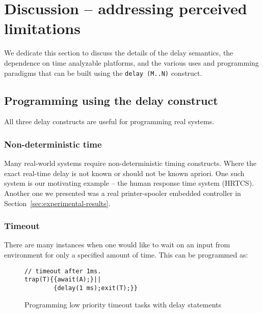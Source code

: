 \section{Discussion -- addressing perceived limitations}
\label{sec:disc-perc-limit}

We dedicate this section to discuss the details of the delay semantics,
the dependence on time analyzable platforms, and the various uses and
programming paradigms that can be built using the \texttt{delay (M..N)}
construct.

\subsection{Programming using the delay construct}
\label{sec:progr-using-delay}

All three delay constructs are useful for programming real systems. %

\subsubsection{Non-deterministic time}
\label{sec:non-determ-time}

Many real-world systems require non-deterministic timing
constructs. Where the exact real-time delay is not known or should not
be known apriori. One such system is our motivating example -- the human
response time system (HRTCS). Another one we presented was a real
printer-spooler embedded controller in
Section~\ref{sec:experimental-results}.

\subsubsection{Timeout}
\label{sec:timeout}

There are many instances when one would like to wait on an input from
environment for only a specified amount of time. This can be programmed
as:

\begin{figure}[h!]
  \centering
			\vspace{-10pt}
			\begin{lstlisting}[style=sysj,basicstyle=\normalsize\ttfamily,morekeywords={await,emit,trap,pause,exit,delay}]
// timeout after 1ms.
trap(T){{await(A);}||
        {delay(1 ms);exit(T);}}
\end{lstlisting}
  \caption{Programming low priority timeout tasks with delay statements}
  \label{fig:timeout}
			\vspace{-10pt}
\end{figure}

